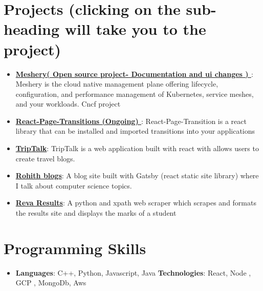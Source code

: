 \documentclass[letterpaper,11pt]{article}
\newcommand{\resumeItem}[2]{
  \item\small{
    \textbf{#1}{: #2 \vspace{-2pt}}
  }
}
\newcommand{\resumeSubItem}[2]{\resumeItem{#1}{#2}\vspace{-4pt}}
\newcommand{\resumeSubHeadingListStart}{\begin{itemize}[leftmargin=*]}
\newcommand{\resumeSubHeadingListEnd}{\end{itemize}}
\begin{document}
\section{Projects (clicking on the sub-heading will take you to the project)}
  \resumeSubHeadingListStart
  \resumeSubItem {\href{https://github.com/meshery/meshery}{ Meshery( Open source project- Documentation and ui changes ) }}
  {Meshery is the cloud native management plane offering lifecycle, configuration, and performance management of Kubernetes, service meshes, and your workloads. Cncf project}
  \resumeSubItem {\href{https://github.com/rohith-cmd/React-Page-Transitions}{ React-Page-Transitions (Ongoing) }}
  { React-Page-Transition is a react library that can be installed and imported transitions into your applications }
    \resumeSubItem{\href{https://triptalk-production.web.app/home}{TripTalk}}
      {TripTalk is a  web application built with react with allows users to create travel blogs.}
    \resumeSubItem{\href{https://rohithblog.gatsbyjs.io/}{Rohith blogs}}
      {A blog site built with Gatsby (react static site library) where I talk about computer science topics.}
    \resumeSubItem{\href{https://github.com/rohith-cmd/Reva-results}{Reva Results}}
    {
    A python and xpath web scraper which scrapes and formats the results site and displays the marks of a student 
    }
  \resumeSubHeadingListEnd

%
\section{Programming Skills}
 \resumeSubHeadingListStart
   \item{
     \textbf{Languages}{: C++, Python, Javascript, Java}
     \hfill
     \textbf{Technologies}{: React, Node , GCP , MongoDb, Aws}
   }
 \resumeSubHeadingListEnd


\end{document}
